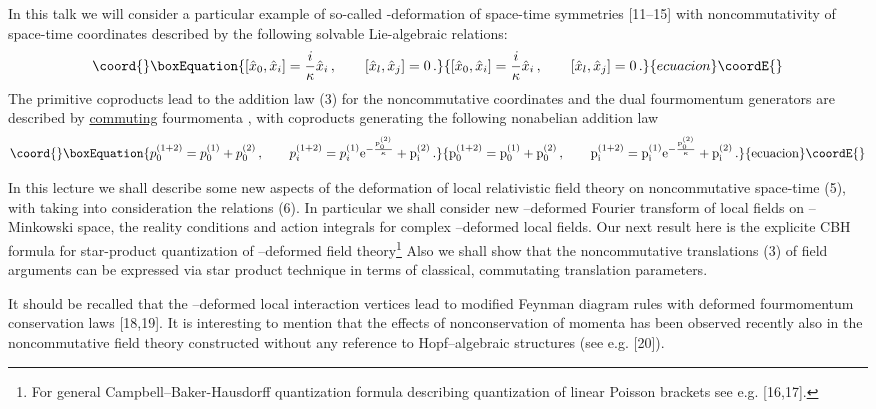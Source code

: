 \documentclass[a4paper,a4paper]{article}
\providecommand\E{\rm e}
\begin{document}
In this talk
 we
 will consider a particular example of
so-called \myHighlight{$\kappa$}\coordHE{}-deformation of space-time symmetries [11--15]
with noncommutativity of space-time coordinates described by
the  following solvable Lie-algebraic  relations:
\begin{equation}\coord{}\boxEquation{
\left[ {\hat{x}}_{0}, {\hat{x}}_{i} \right] = 
\frac{i}{ \kappa} {\hat{x}}_{i}\, ,
\qquad
\left[ {\hat{x}}_{l}, {\hat{x}}_{j} \right] = 0\, .
}{
\left[ {\hat{x}}_{0}, {\hat{x}}_{i} \right] = 
\frac{i}{ \kappa} {\hat{x}}_{i}\, ,
\qquad
\left[ {\hat{x}}_{l}, {\hat{x}}_{j} \right] = 0\, .
}{ecuacion}\coordE{}\end{equation}
The primitive coproducts lead to the
   addition law (3) for the
noncommutative coordinates 
and the dual fourmomentum generators are described by 
\underline{commuting} fourmomenta \coordHE{}, with 
  coproducts generating the following nonabelian 
 addition law 
\begin{equation}\coord{}\boxEquation{
p_{0}^{(1+2)} = p_{0}^{(1)} + p_{0}^{(2)}\, ,
\qquad
p_{i}^{(1+2)}= p_{i}^{(1)}\E^{-{p_{0}^{(2)}\over \kappa}} +
p_{i}^{(2)}\, .
}{
p_{0}^{(1+2)} = p_{0}^{(1)} + p_{0}^{(2)}\, ,
\qquad
p_{i}^{(1+2)}= p_{i}^{(1)}\E^{-{p_{0}^{(2)}\over \kappa}} +
p_{i}^{(2)}\, .
}{ecuacion}\coordE{}\end{equation}

In this lecture  we shall describe some new aspects of 
 the deformation of local
relativistic \coordHE{} field theory on noncommutative space-time
(5), with taking into consideration the relations (6). 
In particular we shall consider new \myHighlight{$\kappa$}\coordHE{}--deformed Fourier
transform of local fields on \coordHE{}  \myHighlight{$\kappa$}\coordHE{}--Minkowski space,
the reality conditions and action integrals for
complex \myHighlight{$\kappa$}\coordHE{}--deformed local fields. Our next result here is
the explicite CBH formula for star-product quantization of
\myHighlight{$\kappa$}\coordHE{}--deformed field theory\footnote{For general
Campbell--Baker-Hausdorff quantization formula describing
quantization of linear Poisson brackets see e.g. [16,17].} 
Also we shall show that the noncommutative translations (3) of
field arguments can be expressed via 
 star product technique in terms of classical, commutating
translation parameters.

It should be recalled that the \myHighlight{$\kappa$}\coordHE{}--deformed local
interaction vertices lead to modified Feynman diagram rules with
deformed fourmomentum conservation laws [18,19]. It is
interesting to mention that the effects of nonconservation of
momenta has been observed recently also in the noncommutative
field theory constructed
  without any reference to Hopf--algebraic structures
(see e.g. [20]).
\end{document}
